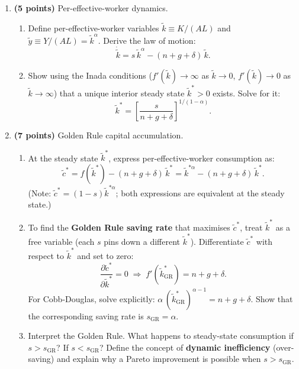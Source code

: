 \documentclass[a4paper,11pt]{article}
\newcommand{\ktilde}{\tilde{k}}
\newcommand{\ytilde}{\tilde{y}}
\newcommand{\ctilde}{\tilde{c}}
\begin{document}
\begin{enumerate}[label=\textbf{\arabic*.}, leftmargin=*, itemsep=6pt]

    \item \textbf{(5 points)} Per-effective-worker dynamics.

    \begin{enumerate}[label=(\alph*), itemsep=4pt]
        \item Define per-effective-worker variables $\ktilde \equiv K/(AL)$ and
        $\ytilde \equiv Y/(AL) = \ktilde^{\alpha}$.  Derive the law of motion:
        \[
            \dot{\ktilde} = s\,\ktilde^{\alpha} - (n+g+\delta)\,\ktilde.
        \]
        \item Show using the Inada conditions ($f'(\ktilde) \to \infty$ as $\ktilde \to 0$,
        $f'(\ktilde) \to 0$ as $\ktilde \to \infty$) that a unique interior steady state
        $\ktilde^* > 0$ exists.  Solve for it:
        \[
            \ktilde^* = \left[\frac{s}{n+g+\delta}\right]^{\!1/(1-\alpha)}.
        \]
    \end{enumerate}

    \item \textbf{(7 points)} Golden Rule capital accumulation.

    \begin{enumerate}[label=(\alph*), itemsep=4pt]
        \item At the steady state $\ktilde^*$, express per-effective-worker consumption as:
        \[
            \ctilde^* = f(\ktilde^*) - (n+g+\delta)\,\ktilde^* = \ktilde^{*\alpha}
            - (n+g+\delta)\,\ktilde^*.
        \]
        (Note: $\ctilde^* = (1-s)\ktilde^{*\alpha}$; both expressions are equivalent at
        the steady state.)

        \item To find the \textbf{Golden Rule saving rate} that maximises $\ctilde^*$,
        treat $\ktilde^*$ as a free variable (each $s$ pins down a different $\ktilde^*$).
        Differentiate $\ctilde^*$ with respect to $\ktilde^*$ and set to zero:
        \[
            \frac{\partial \ctilde^*}{\partial \ktilde^*} = 0
            \;\Longrightarrow\;
            f'(\ktilde^*_{\mathrm{GR}}) = n+g+\delta.
        \]
        For Cobb-Douglas, solve explicitly: $\alpha\,(\ktilde^*_{\mathrm{GR}})^{\alpha-1}
        = n+g+\delta$.  Show that the corresponding saving rate is $s_{\mathrm{GR}} = \alpha$.

        \item Interpret the Golden Rule.  What happens to steady-state consumption if
        $s > s_{\mathrm{GR}}$?  If $s < s_{\mathrm{GR}}$?  Define the concept of
        \textbf{dynamic inefficiency} (over-saving) and explain why a Pareto improvement
        is possible when $s > s_{\mathrm{GR}}$.
    \end{enumerate}


\end{enumerate}
\end{document}
